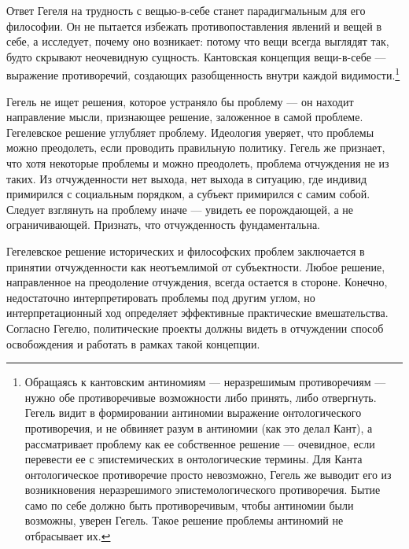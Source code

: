 \documentclass[12pt]{book}
\begin{document}
Ответ Гегеля на трудность с вещью-в-себе станет парадигмальным для его философии. Он не пытается избежать противопоставления явлений и вещей в себе, а исследует, почему оно возникает: потому что вещи всегда выглядят так, будто скрывают неочевидную сущность. Кантовская концепция вещи-в-себе --- выражение противоречий, создающих разобщенность внутри каждой видимости.\footnote{Обращаясь к кантовским антиномиям --- неразрешимым противоречиям --- нужно обе противоречивые возможности либо принять, либо отвергнуть. Гегель видит в формировании антиномии выражение онтологического противоречия, и не обвиняет разум в антиномии (как это делал Кант), а рассматривает проблему как ее собственное решение --- очевидное, если перевести ее с эпистемических в онтологические термины. Для Канта онтологическое противоречие просто невозможно, Гегель же выводит его из возникновения неразрешимого эпистемологического противоречия. Бытие само по себе должно быть противоречивым, чтобы антиномии были возможны, уверен Гегель. Такое решение проблемы антиномий не отбрасывает их.}

Гегель не ищет решения, которое устраняло бы проблему --- он находит направление мысли, признающее решение, заложенное в самой проблеме. Гегелевское решение углубляет проблему. Идеология уверяет, что проблемы можно преодолеть, если проводить правильную политику. Гегель же признает, что хотя некоторые проблемы и можно преодолеть, проблема отчуждения не из таких. Из отчужденности нет выхода, нет выхода в ситуацию, где индивид примирился с социальным порядком, а субъект примирился с самим собой. Следует взглянуть на проблему иначе --- увидеть ее порождающей, а не ограничивающей. Признать, что отчужденность фундаментальна.

Гегелевское решение исторических и философских проблем заключается в принятии отчужденности как неотъемлимой от субъектности. Любое решение, направленное на преодоление отчуждения, всегда остается в стороне. Конечно, недостаточно интерпретировать проблемы под другим углом, но интерпретационный ход определяет эффективные практические вмешательства. Согласно Гегелю, политические проекты должны видеть в отчуждении способ освобождения и работать в рамках такой концепции.
\end{document}
